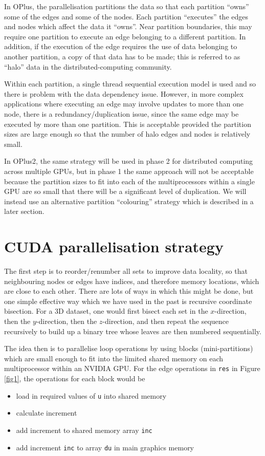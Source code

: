 \documentclass[12pt]{article}
\begin{document}
In OPlus, the parallelisation partitions the data so that each partition 
``owns'' some of the edges and some of the nodes.  Each partition ``executes''
the edges and nodes which affect the data it ``owns''.  Near partition 
boundaries, this may require one partition to execute an edge belonging to a
different partition.  In addition, if the execution of the edge requires the
use of data belonging to another partition, a copy of that data has to be made;
this is referred to as ``halo'' data in the distributed-computing community.

Within each partition, a single thread sequential execution model is used and 
so there is problem with the data dependency issue.  However, in more complex
applications where executing an edge may involve updates to more than one node, 
there is a redundancy/duplication issue, since the same edge may be executed 
by more than one partition. This is acceptable provided the partition sizes 
are large enough so that the number of halo edges and nodes is relatively small.

In OPlus2, the same strategy will be used in phase 2 for distributed computing
across multiple GPUs, but in phase 1 the same approach will not be acceptable
because the partition sizes to fit into each of the multiprocessors within a 
single GPU are so small that there will be a significant level of duplication.
We will instead use an alternative partition ``colouring'' strategy which
is described in a later section.

\newpage

\section{CUDA parallelisation strategy}


The first step is to reorder/renumber all sets to improve data locality,
so that neighbouring nodes or edges have indices, and therefore memory 
locations, which are close to each other.   There are lots of ways in which 
this might be done, but one simple effective way which we have used in the past 
is recursive coordinate bisection.  For a 3D dataset, one would first bisect
each set in the $x$-direction, then the $y$-direction, then the $z$-direction, 
and then repeat the sequence recursively to build up a binary tree whose leaves 
are then numbered sequentially.

The idea then is to parallelise loop operations by using blocks 
(mini-partitions) which are small enough to fit into the limited shared 
memory on each multiprocessor within an NVIDIA GPU.  For the edge 
operations in \verb!res! in Figure \ref{fig1}, the operations for 
each block would be
\begin{itemize}
\item
load in required values of \verb!u! into shared memory
\item
calculate increment
\item
add increment to shared memory array \verb!inc!
\item
add increment \verb!inc! to array \verb!du! in main graphics memory
\end{itemize}
\end{document}
